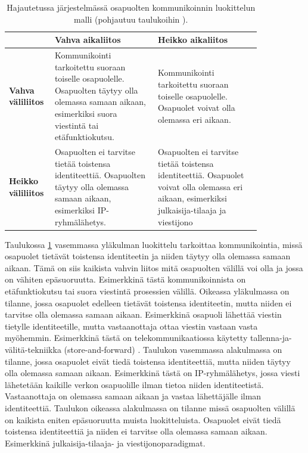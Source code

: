 \begin{table}[ht!]
	\caption{Hajautetussa järjestelmässä osapuolten kommunikoinnin luokittelun malli (pohjautuu taulukoihin \mbox{\cite[s.~231]{distributed-systems-concepts-and-design}} \mbox{\cite[s.~84]{cabri2000mobile}}).}
	\label{tab:communication-models}
	\begin{tabular}{p{0.1\linewidth} | p{0.37\linewidth} | p{0.37\linewidth}}
		\hline
		& \textbf{Vahva aikaliitos} & \textbf{Heikko aikaliitos} \\
		\hline
		\textbf{Vahva väliliitos} & Kommunikointi tarkoitettu suoraan toiselle osapuolelle. Osapuolten täytyy olla olemassa samaan aikaan, esimerkiksi suora viestintä tai etäfunktiokutsu. & Kommunikointi tarkoitettu suoraan toiselle osapuolelle. Osapuolet voivat olla olemassa eri aikaan.\\
		\hline
		\textbf{Heikko väliliitos} & Osapuolten ei tarvitse tietää toistensa identiteettiä. Osapuolten täytyy olla olemassa samaan aikaan, esimerkiksi IP-ryhmälähetys. & Osapuolten ei tarvitse tietää toistensa identiteettiä. Osapuolet voivat olla olemassa eri aikaan, esimerkiksi julkaisija-tilaaja ja viestijono \\
		\hline
	\end{tabular}
\end{table}

Taulukossa \ref{tab:communication-models} vasemmassa yläkulman luokittelu tarkoittaa kommunikointia, missä osapuolet tietävät toistensa identiteetin ja niiden täytyy olla olemassa samaan aikaan. Tämä on siis kaikista vahvin liitos mitä osapuolten välillä voi olla ja jossa on vähiten epäsuoruutta. Esimerkkinä tästä kommunikoinnista on etäfunktiokutsu tai suora viestintä prosessien välillä. Oikeassa yläkulmassa on tilanne, jossa osapuolet edelleen tietävät toistensa identiteetin, mutta niiden ei tarvitse olla olemassa samaan aikaan. Esimerkkinä osapuoli lähettää viestin tietylle identiteetille, mutta vastaanottaja ottaa viestin vastaan vasta myöhemmin. Esimerkkinä tästä on telekommunikaatiossa käytetty tallenna-ja-välitä-tekniikka (store-and-forward) \cite{dictionary-of-computer-science}. Taulukon vasemmassa alakulmassa on tilanne, jossa osapuolet eivät tiedä toistensa identiteettiä, mutta niiden täytyy olla olemassa samaan aikaan. Esimerkkinä tästä on IP-ryhmälähetys, jossa viesti lähetetään kaikille verkon osapuolille ilman tietoa niiden identiteetistä. Vastaanottaja on olemassa samaan aikaan ja vastaa lähettäjälle ilman identiteettiä. Taulukon oikeassa alakulmassa on tilanne missä osapuolten välillä on kaikista eniten epäsuoruutta muista luokitteluista. Osapuolet eivät tiedä toistensa identiteettiä ja niiden ei tarvitse olla olemassa samaan aikaan. Esimerkkinä julkaisija-tilaaja- ja viestijonoparadigmat. \mbox{\cite[s.~230--232]{distributed-systems-concepts-and-design}} \mbox{\cite{cabri2000mobile}}

